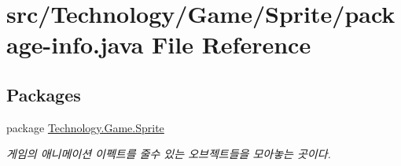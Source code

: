 \hypertarget{_technology_2_game_2_sprite_2package-info_8java}{\section{src/\-Technology/\-Game/\-Sprite/package-\/info.java File Reference}
\label{_technology_2_game_2_sprite_2package-info_8java}
}
\subsection*{Packages}
\begin{DoxyCompactItemize}
\item 
package \hyperlink{namespace_technology_1_1_game_1_1_sprite}{Technology.\-Game.\-Sprite}
\begin{DoxyCompactList}\small\item\em 게임의 애니메이션 이펙트를 줄수 있는 오브젝트들을 모아놓는 곳이다. \end{DoxyCompactList}\end{DoxyCompactItemize}
